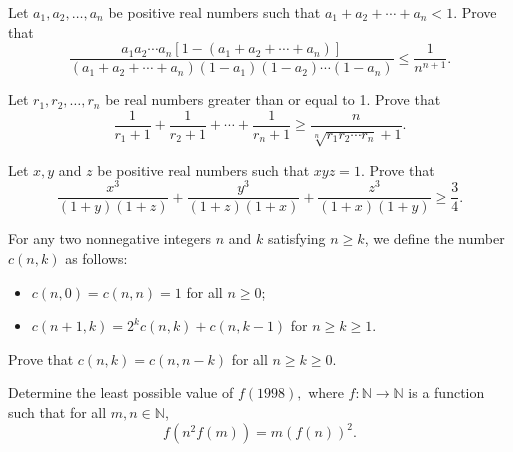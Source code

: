 \item[\textbf{A1.}]Let $a_{1},a_{2},\ldots ,a_{n}$ be positive real numbers such that $a_{1}+a_{2}+\cdots +a_{n}<1$. Prove that\[ \frac{a_{1} a_{2} \cdots a_{n} \left[ 1 - (a_{1} + a_{2} + \cdots + a_{n}) \right] }{(a_{1} + a_{2} + \cdots + a_{n})( 1 - a_{1})(1 - a_{2}) \cdots (1 - a_{n})} \leq \frac{1}{ n^{n+1}}. \]

\item[\textbf{A2.}]Let $r_{1},r_{2},\ldots ,r_{n}$ be real numbers greater than or equal to 1. Prove that\[ \frac{1}{r_{1} + 1} + \frac{1}{r_{2} + 1} + \cdots +\frac{1}{r_{n}+1} \geq \frac{n}{ \sqrt[n]{r_{1}r_{2} \cdots r_{n}}+1}. \]

\item[\textbf{A3.}]Let $x,y$ and $z$ be positive real numbers such that $xyz=1$. Prove that\[
 \frac{x^{3}}{(1 + y)(1 + z)}+\frac{y^{3}}{(1 + z)(1 + x)}+\frac{z^{3}}{(1 + x)(1 + y)}
 \geq \frac{3}{4}. 
\]

\item[\textbf{A4.}]For any two nonnegative integers $n$ and $k$ satisfying $n\geq k$,  we define the number $c(n,k)$ as follows:

\begin{itemize}

\item $c\left(n,0\right)=c\left(n,n\right)=1$ for all $n\geq 0$;

\item $c\left(n+1,k\right)=2^{k}c\left(n,k\right)+c\left(n,k-1\right)$ for $n\geq k\geq 1$.

\end{itemize}
Prove that $c\left(n,k\right)=c\left(n,n-k\right)$ for all $n\geq k\geq 0$.

\item[\textbf{A5.}]Determine the least possible value of $f(1998),$ where $f:\mathbb{N}\to \mathbb{N}$ is a function such that for all $m,n\in \mathbb{N}$, \[f\left( n^{2}f(m)\right) =m\left( f(n)\right) ^{2}. \]

